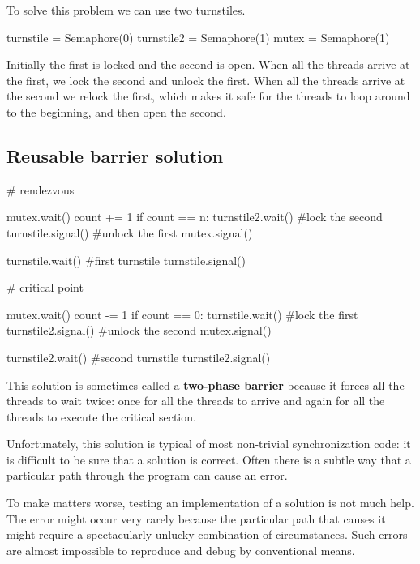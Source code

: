 \documentclass{book}
\begin{document}
To solve this problem we can use two turnstiles.

\begin{unbreakable}[title={Reusable barrier hint}]{}
turnstile = Semaphore(0)
turnstile2 = Semaphore(1)
mutex = Semaphore(1)
\end{unbreakable}

Initially the first is locked and the second is open.  When all the
threads arrive at the first, we lock the second and unlock the first.
When all the threads arrive at the second we relock the first,
which makes it safe for the threads to loop around to the beginning,
and then open the second.

\subsection {Reusable barrier solution}

\begin{unbreakable}[title={Reusable barrier solution}]{}
# rendezvous

mutex.wait()
  count += 1
  if count == n:
    turnstile2.wait()   #lock the second
    turnstile.signal()  #unlock the first
mutex.signal()

turnstile.wait()        #first turnstile
turnstile.signal()

# critical point

mutex.wait()
  count -= 1
  if count == 0: 
    turnstile.wait()    #lock the first
    turnstile2.signal() #unlock the second
mutex.signal()

turnstile2.wait()       #second turnstile
turnstile2.signal()
\end{unbreakable}

This solution is sometimes called a {\bf two-phase barrier} because
it forces all the threads to wait twice: once for all the threads
to arrive and again for all the threads to execute the critical
section.

Unfortunately, this solution is typical of most non-trivial
synchronization code: it is difficult to be sure that a solution is
correct.  Often there is a subtle way that a particular path through
the program can cause an error.

To make matters worse, testing an implementation of a solution
is not much help.  The error might occur very rarely
because the particular path that causes it might
require a spectacularly unlucky combination of circumstances.
Such errors are almost
impossible to reproduce and debug by conventional means.
\end{document}
